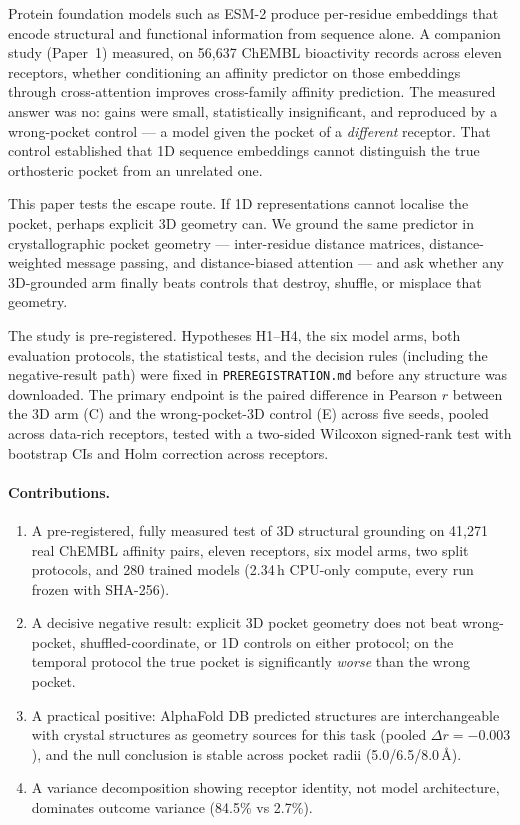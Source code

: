 \documentclass[11pt]{article}
\begin{document}
Protein foundation models such as ESM-2 produce per-residue embeddings that
encode structural and functional information from sequence alone. A
companion study (Paper~1) measured, on 56{,}637 ChEMBL bioactivity records
across eleven receptors, whether conditioning an affinity predictor on
those embeddings through cross-attention improves cross-family affinity
prediction. The measured answer was no: gains were small, statistically
insignificant, and reproduced by a wrong-pocket control --- a model given
the pocket of a \emph{different} receptor. That control established that
1D sequence embeddings cannot distinguish the true orthosteric pocket from
an unrelated one.

This paper tests the escape route. If 1D representations cannot localise
the pocket, perhaps explicit 3D geometry can. We ground the same
predictor in crystallographic pocket geometry --- inter-residue distance
matrices, distance-weighted message passing, and distance-biased
attention --- and ask whether any 3D-grounded arm finally beats controls
that destroy, shuffle, or misplace that geometry.

The study is pre-registered. Hypotheses H1--H4, the six model arms, both
evaluation protocols, the statistical tests, and the decision rules
(including the negative-result path) were fixed in
\texttt{PREREGISTRATION.md} before any structure was downloaded. The
primary endpoint is the paired difference in Pearson $r$ between the 3D
arm (C) and the wrong-pocket-3D control (E) across five seeds, pooled
across data-rich receptors, tested with a two-sided Wilcoxon signed-rank
test with bootstrap CIs and Holm correction across receptors.

\paragraph{Contributions.}
\begin{enumerate}[leftmargin=1.5em,itemsep=0pt]
  \item A pre-registered, fully measured test of 3D structural grounding
        on 41{,}271 real ChEMBL affinity pairs, eleven receptors, six
        model arms, two split protocols, and 280 trained models
        (2.34\,h CPU-only compute, every run frozen with SHA-256).
  \item A decisive negative result: explicit 3D pocket geometry does not
        beat wrong-pocket, shuffled-coordinate, or 1D controls on either
        protocol; on the temporal protocol the true pocket is
        significantly \emph{worse} than the wrong pocket.
  \item A practical positive: AlphaFold DB predicted structures are
        interchangeable with crystal structures as geometry sources for
        this task (pooled $\Delta r=-0.003$), and the null conclusion is
        stable across pocket radii (5.0/6.5/8.0\,\AA).
  \item A variance decomposition showing receptor identity, not model
        architecture, dominates outcome variance (84.5\% vs 2.7\%).
\end{enumerate}
\end{document}
